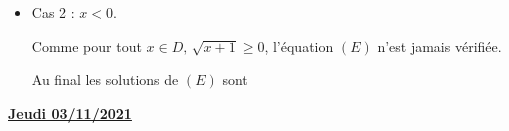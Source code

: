 \documentclass[a4paper, 11pt,reqno]{article}
\newcommand{\jour}[1]{
\begin{center}
\underline{\textbf{#1}}
\end{center}

 }
\begin{document}
\begin{correction}
\begin{enumerate}
\begin{itemize}
\begin{center}
\end{center}
\item Cas 2 : $x<0$. 

Comme pour tout $x\in D, \, \sqrt{x+1} \geq 0$, l'équation $(E)$ n'est jamais vérifiée.  
\begin{center}

\end{center}

Au final les solutions de $(E)$ sont 

\begin{center}
\fbox{$\cS =\left[\frac{1+\sqrt{5}}{2},+\infty \right[$}
\end{center}



\end{itemize}





\end{enumerate}
\end{correction} 
\newpage
\jour{Jeudi 03/11/2021}
\end{document}
